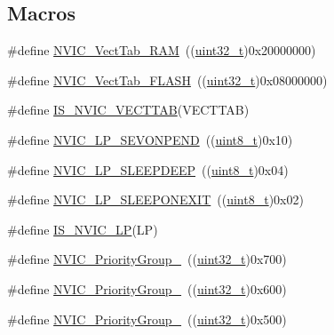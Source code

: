 \subsection*{Macros}
\begin{DoxyCompactItemize}
\item 
\#define \hyperlink{group___vector___table___base_ga8be8181cc3e5d42f6204af306ab50f80}{N\+V\+I\+C\+\_\+\+Vect\+Tab\+\_\+\+R\+AM}~((\hyperlink{_p_e___types_8h_a33594304e786b158f3fb30289278f5af}{uint32\+\_\+t})0x20000000)
\item 
\#define \hyperlink{group___vector___table___base_gafbf92fd28a1090b2aa49732ebd5704b5}{N\+V\+I\+C\+\_\+\+Vect\+Tab\+\_\+\+F\+L\+A\+SH}~((\hyperlink{_p_e___types_8h_a33594304e786b158f3fb30289278f5af}{uint32\+\_\+t})0x08000000)
\item 
\#define \hyperlink{group___vector___table___base_ga26b9d493ccb98fcce9a27303078940c8}{I\+S\+\_\+\+N\+V\+I\+C\+\_\+\+V\+E\+C\+T\+T\+AB}(V\+E\+C\+T\+T\+AB)
\item 
\#define \hyperlink{group___system___low___power_ga10748d2b2875afd122f6476864ad6cae}{N\+V\+I\+C\+\_\+\+L\+P\+\_\+\+S\+E\+V\+O\+N\+P\+E\+ND}~((\hyperlink{_p_e___types_8h_aba7bc1797add20fe3efdf37ced1182c5}{uint8\+\_\+t})0x10)
\item 
\#define \hyperlink{group___system___low___power_gaeec2d10922fa9ec5e65398667b303253}{N\+V\+I\+C\+\_\+\+L\+P\+\_\+\+S\+L\+E\+E\+P\+D\+E\+EP}~((\hyperlink{_p_e___types_8h_aba7bc1797add20fe3efdf37ced1182c5}{uint8\+\_\+t})0x04)
\item 
\#define \hyperlink{group___system___low___power_ga368dc13a9c762a307c07cfa2e3ef59ad}{N\+V\+I\+C\+\_\+\+L\+P\+\_\+\+S\+L\+E\+E\+P\+O\+N\+E\+X\+IT}~((\hyperlink{_p_e___types_8h_aba7bc1797add20fe3efdf37ced1182c5}{uint8\+\_\+t})0x02)
\item 
\#define \hyperlink{group___system___low___power_ga985896f03bc1d7b3da17a212f1bc3de9}{I\+S\+\_\+\+N\+V\+I\+C\+\_\+\+LP}(LP)
\item 
\#define \hyperlink{group___preemption___priority___group_gaeac0cf537f65d17bc19aee2410b2b60e}{N\+V\+I\+C\+\_\+\+Priority\+Group\+\_}~((\hyperlink{_p_e___types_8h_a33594304e786b158f3fb30289278f5af}{uint32\+\_\+t})0x700)
\item 
\#define \hyperlink{group___preemption___priority___group_ga89bf0bf9e70f1a372a541b1b8d7493aa}{N\+V\+I\+C\+\_\+\+Priority\+Group\+\_}~((\hyperlink{_p_e___types_8h_a33594304e786b158f3fb30289278f5af}{uint32\+\_\+t})0x600)
\item 
\#define \hyperlink{group___preemption___priority___group_ga505002e8b76aef65499ca371e40ec8b4}{N\+V\+I\+C\+\_\+\+Priority\+Group\+\_}~((\hyperlink{_p_e___types_8h_a33594304e786b158f3fb30289278f5af}{uint32\+\_\+t})0x500)

\end{DoxyCompactItemize}
